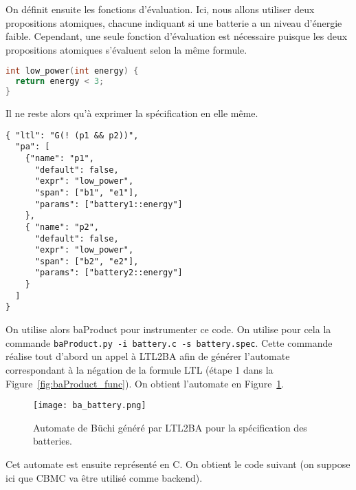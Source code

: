 On définit ensuite les fonctions d'évaluation. Ici, nous allons utiliser deux
propositions atomiques, chacune indiquant si une batterie a un niveau
d'énergie faible. Cependant, une seule fonction d'évaluation est nécessaire
puisque les deux propositions atomiques s'évaluent selon la même formule.

\begin{lstlisting}[language=C, frame=single, caption=Fonction d'évaluation]
int low_power(int energy) {
  return energy < 3;
}
\end{lstlisting}

Il ne reste alors qu'à exprimer la spécification en elle même.

\begin{lstlisting}[frame=single, caption=Spécification]
{ "ltl": "G(! (p1 && p2))",
  "pa": [
    {"name": "p1",
      "default": false,
      "expr": "low_power",
      "span": ["b1", "e1"],
      "params": ["battery1::energy"]
    },
    { "name": "p2",
      "default": false,
      "expr": "low_power",
      "span": ["b2", "e2"],
      "params": ["battery2::energy"]
    }
  ]
}
\end{lstlisting}

On utilise alors baProduct pour instrumenter ce code. On utilise pour cela
la commande \texttt{baProduct.py -i battery.c -s battery.spec}. Cette commande
réalise tout d'abord un appel à LTL2BA afin de générer l'automate correspondant
à la négation de la formule LTL (étape 1 dans la
Figure~\ref{fig:baProduct_func}). On obtient l'automate en
Figure~\ref{fig:ba_battery}.

\begin{figure}[ht]
\begin{center}
  \texttt{[image: ba\_battery.png]}
\end{center}
\caption{Automate de Büchi généré par LTL2BA pour la spécification des
batteries.}
\label{fig:ba_battery}
\end{figure}

Cet automate est ensuite représenté en C. On obtient le code suivant (on suppose
ici que CBMC va être utilisé comme backend).

